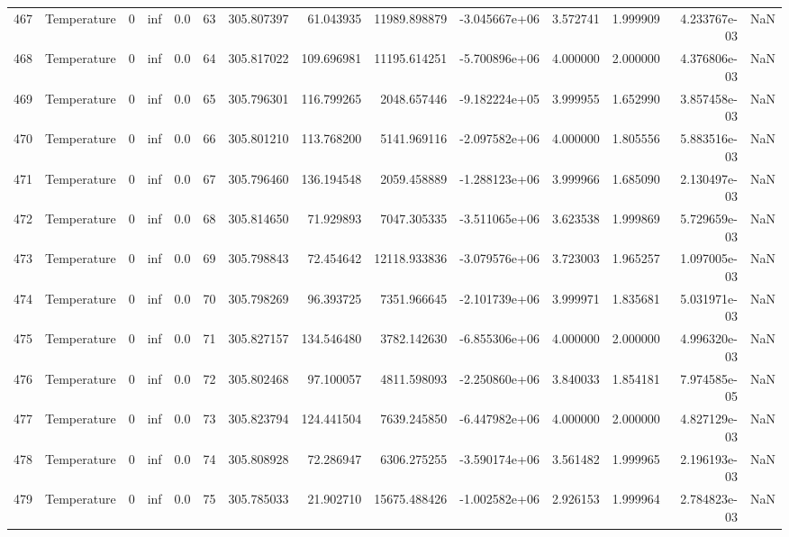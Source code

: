 \begin{tabular}{llrrrrrrrrrrrr}
467 &  Temperature &       0 &  inf &  0.0 &   63 &  305.807397 &    61.043935 &   11989.898879 & -3.045667e+06 &  3.572741 &  1.999909 &  4.233767e-03 &      NaN \\
468 &  Temperature &       0 &  inf &  0.0 &   64 &  305.817022 &   109.696981 &   11195.614251 & -5.700896e+06 &  4.000000 &  2.000000 &  4.376806e-03 &      NaN \\
469 &  Temperature &       0 &  inf &  0.0 &   65 &  305.796301 &   116.799265 &    2048.657446 & -9.182224e+05 &  3.999955 &  1.652990 &  3.857458e-03 &      NaN \\
470 &  Temperature &       0 &  inf &  0.0 &   66 &  305.801210 &   113.768200 &    5141.969116 & -2.097582e+06 &  4.000000 &  1.805556 &  5.883516e-03 &      NaN \\
471 &  Temperature &       0 &  inf &  0.0 &   67 &  305.796460 &   136.194548 &    2059.458889 & -1.288123e+06 &  3.999966 &  1.685090 &  2.130497e-03 &      NaN \\
472 &  Temperature &       0 &  inf &  0.0 &   68 &  305.814650 &    71.929893 &    7047.305335 & -3.511065e+06 &  3.623538 &  1.999869 &  5.729659e-03 &      NaN \\
473 &  Temperature &       0 &  inf &  0.0 &   69 &  305.798843 &    72.454642 &   12118.933836 & -3.079576e+06 &  3.723003 &  1.965257 &  1.097005e-03 &      NaN \\
474 &  Temperature &       0 &  inf &  0.0 &   70 &  305.798269 &    96.393725 &    7351.966645 & -2.101739e+06 &  3.999971 &  1.835681 &  5.031971e-03 &      NaN \\
475 &  Temperature &       0 &  inf &  0.0 &   71 &  305.827157 &   134.546480 &    3782.142630 & -6.855306e+06 &  4.000000 &  2.000000 &  4.996320e-03 &      NaN \\
476 &  Temperature &       0 &  inf &  0.0 &   72 &  305.802468 &    97.100057 &    4811.598093 & -2.250860e+06 &  3.840033 &  1.854181 &  7.974585e-05 &      NaN \\
477 &  Temperature &       0 &  inf &  0.0 &   73 &  305.823794 &   124.441504 &    7639.245850 & -6.447982e+06 &  4.000000 &  2.000000 &  4.827129e-03 &      NaN \\
478 &  Temperature &       0 &  inf &  0.0 &   74 &  305.808928 &    72.286947 &    6306.275255 & -3.590174e+06 &  3.561482 &  1.999965 &  2.196193e-03 &      NaN \\
479 &  Temperature &       0 &  inf &  0.0 &   75 &  305.785033 &    21.902710 &   15675.488426 & -1.002582e+06 &  2.926153 &  1.999964 &  2.784823e-03 &      NaN \\

\end{tabular}
